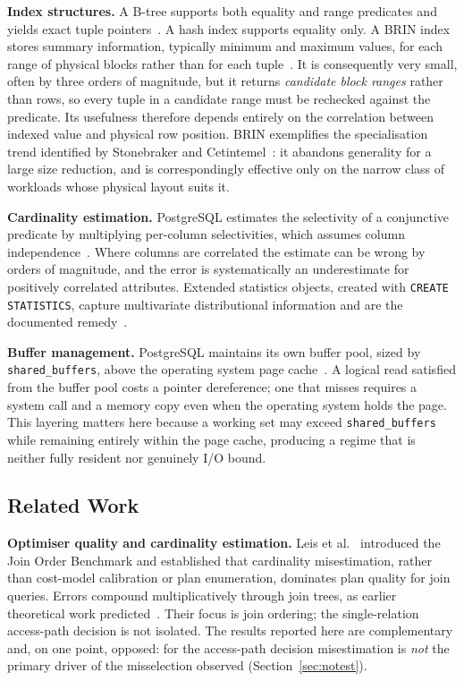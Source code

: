 \documentclass[12pt, a4paper]{article}
\newcommand{\sbuf}{\texttt{shared\_buffers}}
\begin{document}
\textbf{Index structures.} A B-tree supports both equality and range
predicates and yields exact tuple
pointers~\cite{comer1979ubiquitous, graefe2011modern}. A hash index
supports equality only. A BRIN index stores summary information,
typically minimum and maximum values, for each range of physical blocks
rather than for each tuple~\cite{pgdocs17brin}. It is consequently very
small, often by three orders of magnitude, but it returns
\emph{candidate block ranges} rather than rows, so every tuple in a
candidate range must be rechecked against the predicate. Its usefulness
therefore depends entirely on the correlation between indexed value and
physical row position. BRIN exemplifies the specialisation trend
identified by Stonebraker and Cetintemel~\cite{stonebraker2005goes}: it
abandons generality for a large size reduction, and is correspondingly
effective only on the narrow class of workloads whose physical layout
suits it.

\textbf{Cardinality estimation.} PostgreSQL estimates the selectivity of
a conjunctive predicate by multiplying per-column selectivities, which
assumes column independence~\cite{pgdocs17planner}. Where columns are
correlated the estimate can be wrong by orders of magnitude, and the
error is systematically an underestimate for positively correlated
attributes. Extended statistics objects, created with
\texttt{CREATE STATISTICS}, capture multivariate distributional
information and are the documented remedy~\cite{pgdocs17createstats}.

\textbf{Buffer management.} PostgreSQL maintains its own buffer pool,
sized by \sbuf{}, above the operating system page
cache~\cite{effelsberg1984principles}. A logical read satisfied from the
buffer pool costs a pointer dereference; one that misses requires a
system call and a memory copy even when the operating system holds the
page. This layering matters here because a working set may exceed
\sbuf{} while remaining entirely within the page cache, producing a
regime that is neither fully resident nor genuinely I/O bound.

\subsection{Related Work}

\textbf{Optimiser quality and cardinality estimation.} Leis et
al.~\cite{leis2015good, leis2018query} introduced the Join Order
Benchmark and established that cardinality misestimation, rather than
cost-model calibration or plan enumeration, dominates plan quality for
join queries. Errors compound multiplicatively through join trees, as earlier
theoretical work predicted~\cite{ioannidis1991propagation}. Their focus
is join ordering; the single-relation access-path decision is not
isolated. The results reported here are complementary and, on one point,
opposed: for the access-path decision misestimation is \emph{not} the
primary driver of the misselection observed
(Section~\ref{sec:notest}).
\end{document}
